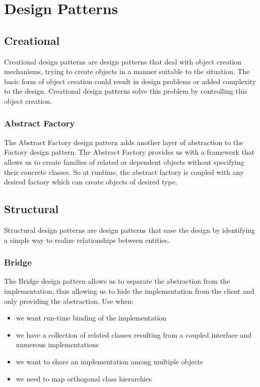 \chapter{Design Patterns}

\section{Creational}
Creational design patterns are design patterns that deal with object creation
mechanisms, trying to create objects in a manner suitable to the situation. The basic form of object
creation could result in design problems or added complexity to the design. Creational design patterns
solve this problem by controlling this object creation.

\subsection{Abstract Factory}
The Abstract Factory design pattern adds another layer of abstraction to the Factory design pattern.
The Abstract Factory provides us with a framework that allows us to create families of related or
dependent objects without specifying their concrete classes. So at runtime, the abstract factory is
coupled with any desired factory which can create objects of desired type.

\section{Structural}
Structural design patterns are design patterns that ease the design by identifying a simple way to
realize relationships between entities.

\subsection{Bridge}
The Bridge design pattern allows us to separate the abstraction from the implementation, thus
allowing us to hide the implementation from the client and only providing the abstraction.
Use when:
\begin{itemize}
	\item we want run-time binding of the implementation
	\item we have a collection of related classes resulting from a coupled interface and numerous
	      implementations
	\item we want to share an implementation among multiple objects
	\item we need to map orthogonal class hierarchies
\end{itemize}

